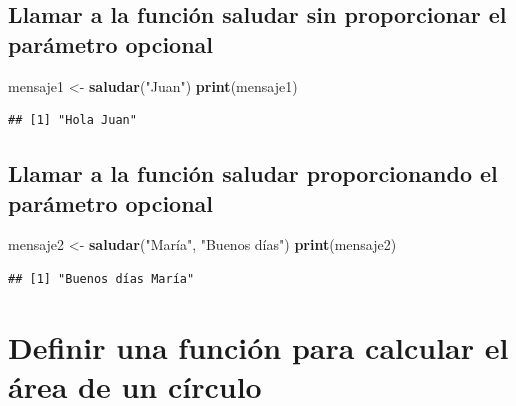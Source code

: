 \documentclass[
]{book}
\newenvironment{Shaded}{\begin{snugshade}}{\end{snugshade}}
\newcommand{\FunctionTok}[1]{\textcolor[rgb]{0.13,0.29,0.53}{\textbf{#1}}}
\newcommand{\NormalTok}[1]{#1}
\newcommand{\OtherTok}[1]{\textcolor[rgb]{0.56,0.35,0.01}{#1}}
\newcommand{\StringTok}[1]{\textcolor[rgb]{0.31,0.60,0.02}{#1}}
\begin{document}
\hypertarget{llamar-a-la-funciuxf3n-saludar-sin-proporcionar-el-paruxe1metro-opcional}{%
\subsection{Llamar a la función saludar sin proporcionar el parámetro opcional}\label{llamar-a-la-funciuxf3n-saludar-sin-proporcionar-el-paruxe1metro-opcional}}

\begin{Shaded}
\begin{Highlighting}[]
\NormalTok{mensaje1 }\OtherTok{\textless{}{-}} \FunctionTok{saludar}\NormalTok{(}\StringTok{"Juan"}\NormalTok{)}
\FunctionTok{print}\NormalTok{(mensaje1)}
\end{Highlighting}
\end{Shaded}

\begin{verbatim}
## [1] "Hola Juan"
\end{verbatim}

\hypertarget{llamar-a-la-funciuxf3n-saludar-proporcionando-el-paruxe1metro-opcional}{%
\subsection{Llamar a la función saludar proporcionando el parámetro opcional}\label{llamar-a-la-funciuxf3n-saludar-proporcionando-el-paruxe1metro-opcional}}

\begin{Shaded}
\begin{Highlighting}[]
\NormalTok{mensaje2 }\OtherTok{\textless{}{-}} \FunctionTok{saludar}\NormalTok{(}\StringTok{"María"}\NormalTok{, }\StringTok{"Buenos días"}\NormalTok{)}
\FunctionTok{print}\NormalTok{(mensaje2)}
\end{Highlighting}
\end{Shaded}

\begin{verbatim}
## [1] "Buenos días María"
\end{verbatim}

\hypertarget{definir-una-funciuxf3n-para-calcular-el-uxe1rea-de-un-cuxedrculo}{%
\section{Definir una función para calcular el área de un círculo}\label{definir-una-funciuxf3n-para-calcular-el-uxe1rea-de-un-cuxedrculo}}
\end{document}
